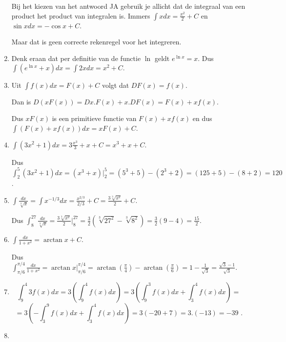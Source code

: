 \documentclass{article}
\begin{document}
\begin{enumerate}
Bij het kiezen van het antwoord JA gebruik je allicht dat de integraal van een product het product van integralen is.
Immers $\int xdx=\frac{x^2}{2}+C$ en $\sin x dx=-\cos x+C$.

Maar dat is geen correcte rekenregel voor het integreren.

\item

Denk eraan dat per definitie van de functie $\ln$ geldt $e^{\ln x}=x$.
Dus $\int \left( e^{\ln x}+x \right) dx=\int 2xdx=x^2+C$.

\item

Uit $\int f(x)dx=F(x)+C$ volgt dat $DF(x)=f(x)$.

Dan is $D(xF(x))=Dx.F(x)+x.DF(x)=F(x)+xf(x)$.

Dus $xF(x)$ is een primitieve functie van $F(x)+xf(x)$ en dus $\int \left( F(x)+xf(x)  \right)dx=xF(x)+C$.

\item

$\int \left( 3x^2+1 \right) dx = 3\frac{x^3}{3}+x+C=x^3+x+C$.

Dus $\int _2^5 \left( 3x^2+1  \right)dx=\left(  x^3+x  \right)\vert ^5_2 =\left( 5^3+5  \right)-\left(  2^3+2 \right)=(125+5)-(8+2)=120$.

\item

$\int \frac{dx}{\sqrt[3]{x}} = \int x^{-1/3}dx=\frac{x^{2/3}}{2/3}+C=\frac{3\sqrt[3]{x^2}}{2}+C$.

Dus $\int_8^{27} \frac{dx}{\sqrt[3]{x}} =\frac{3\sqrt[3]{x^2}}{2} \vert_8^{27}=\frac{3}{2} \left(  \sqrt[3]{27^2}-\sqrt[3]{8^2} \right)=\frac{3}{2} (9-4)=\frac{15}{2}$.

\item

$\int \frac{dx}{1+x^2} = \arctan x+C$.

Dus $\int_{\pi /6}^{\pi /4}  \frac{dx}{1+x^2}=\arctan x \vert _{\pi /6}^{\pi /4}=\arctan \left( \frac{\pi}{4}  \right) - \arctan \left( \frac{\pi}{6}  \right)=1-\frac{1}{\sqrt{3}}=\frac{\sqrt{3}-1}{\sqrt{3}}$.

\item

\[
\int^4_9 3f(x)dx=3\left(  \int^4_9 f(x)dx \right)=3\left(  \int^3_9 f(x)dx + \int^4_3 f(x)dx  \right)=
\]
\[
=3\left( - \int^9_3 f(x)dx + \int^4_3 f(x)dx  \right)=3 (-20+ 7)=3.(-13)=-39 \text { .}
\]
 
\item


\end{enumerate}
\end{document}
